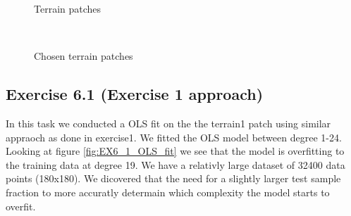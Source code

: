 \documentclass[11pt, a4paper]{article}
\begin{document}
\begin{figure}
  \caption{Terrain patches}%
  \label{fig:terrain_patches}%
\end{figure}

\begin{figure}
  \centering
  \\
  \caption{Chosen terrain patches}%
  \label{fig:terrain_patches_focus}%
\end{figure}


\subsection*{Exercise 6.1 (Exercise 1 approach)}
In this task we conducted a OLS fit on the the terrain1 patch using similar appraoch as done in exercise1. We fitted the OLS model between degree 1-24.
Looking at figure \ref{fig:EX6_1_OLS_fit} we see that the model is overfitting to the training data at degree 19. We have a relativly large dataset of 
32400 data points (180x180). We dicovered that the need for a slightly larger test sample fraction to more accuratly determain which complexity the model starts to overfit. 
\end{document}
